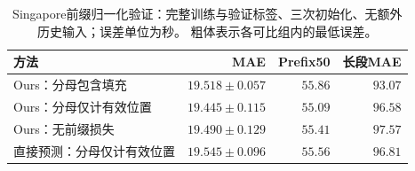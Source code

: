 \begin{table}[t]
\centering\footnotesize\setlength{\tabcolsep}{4pt}
\caption{Singapore前缀归一化验证：完整训练与验证标签、三次初始化、无额外历史输入；误差单位为秒。 粗体表示各可比组内的最低误差。}\label{tab:prefix_fixed}
\begin{tabular}{lrrr}\toprule
方法 & MAE & Prefix50 & 长段MAE\\\midrule
Ours：分母包含填充 & $19.518\pm0.057$ & $55.86$ & $\mathbf{93.07}$\\
Ours：分母仅计有效位置 & $\mathbf{19.445\pm0.115}$ & $\mathbf{55.09}$ & $96.58$\\
Ours：无前缀损失 & $19.490\pm0.129$ & $55.41$ & $97.57$\\
直接预测：分母仅计有效位置 & $19.545\pm0.096$ & $55.56$ & $96.81$\\
\bottomrule\end{tabular}
\end{table}
